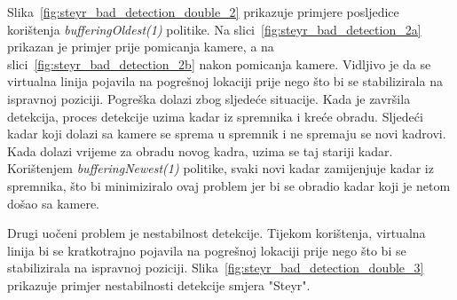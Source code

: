 Slika~\ref{fig:steyr_bad_detection_double_2} prikazuje primjere posljedice korištenja \textit{bufferingOldest(1)} politike. Na slici~\ref{fig:steyr_bad_detection_2a} prikazan je primjer prije pomicanja kamere, a na slici~\ref{fig:steyr_bad_detection_2b} nakon pomicanja kamere. Vidljivo je da se virtualna linija pojavila na pogrešnoj lokaciji prije nego što bi se stabilizirala na ispravnoj poziciji. Pogreška dolazi zbog sljedeće situacije. Kada je završila detekcija, proces detekcije uzima kadar iz spremnika i kreće obradu. Sljedeći kadar koji dolazi sa kamere se sprema u spremnik i ne spremaju se novi kadrovi. Kada dolazi vrijeme za obradu novog kadra, uzima se taj stariji kadar. Korištenjem \textit{bufferingNewest(1)} politike, svaki novi kadar zamijenjuje kadar iz spremnika, što bi minimiziralo ovaj problem jer bi se obradio kadar koji je netom došao sa kamere.



Drugi uočeni problem je nestabilnost detekcije. Tijekom korištenja, virtualna linija bi se kratkotrajno pojavila na pogrešnoj lokaciji prije nego što bi se stabilizirala na ispravnoj poziciji. Slika~\ref{fig:steyr_bad_detection_double_3} prikazuje primjer nestabilnosti detekcije smjera "Steyr".

